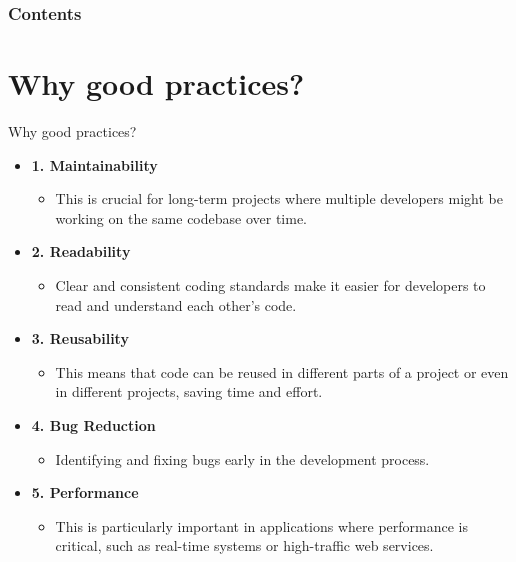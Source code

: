 \documentclass[10pt]{beamer}
\title[Universidad Panamericana]{}
\subtitle{FreeRTOS Architecture Part 1}
\author[]{Name}
\institute[ltonix@up.edu.mx]{Universidad Panamericana}
\date[Presentation \today]{Presentation \today}
\begin{document}
\frame{\titlepage}
\begin{frame}
\frametitle{Contents}
\tableofcontents
\end{frame}

\section{Why good practices?}
\begin{frame} {Why good practices?}
    \begin{itemize}
      \item \textbf{1. Maintainability}
      \begin{itemize}
        \item This is crucial for long-term projects where multiple developers might be working on the same codebase over time.
      \end{itemize}
      \item \textbf{2. Readability}
      \begin{itemize}
        \item Clear and consistent coding standards make it easier for developers to read and understand each other's code.
      \end{itemize}
      \item \textbf{3. Reusability}
      \begin{itemize}
        \item This means that code can be reused in different parts of a project or even in different projects, saving time and effort.
      \end{itemize}
      \item \textbf{4. Bug Reduction}
      \begin{itemize}
        \item Identifying and fixing bugs early in the development process.
      \end{itemize}
      \item \textbf{5. Performance}
      \begin{itemize}
        \item This is particularly important in applications where performance is critical, such as real-time systems or high-traffic web services.
      \end{itemize}
    \end{itemize}
  
\end{frame}
\end{document}
